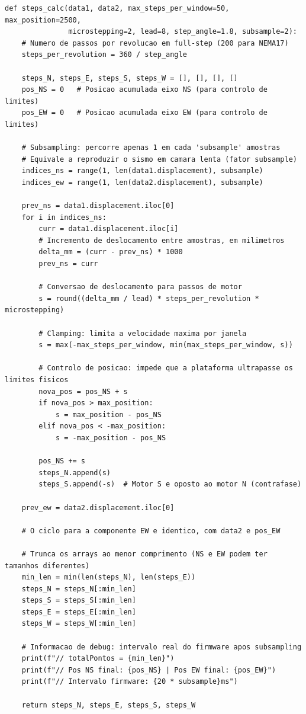 \begin{listing}[h]
\begin{verbatim}
def steps_calc(data1, data2, max_steps_per_window=50, max_position=2500,
               microstepping=2, lead=8, step_angle=1.8, subsample=2):
    # Numero de passos por revolucao em full-step (200 para NEMA17)
    steps_per_revolution = 360 / step_angle

    steps_N, steps_E, steps_S, steps_W = [], [], [], []
    pos_NS = 0   # Posicao acumulada eixo NS (para controlo de limites)
    pos_EW = 0   # Posicao acumulada eixo EW (para controlo de limites)

    # Subsampling: percorre apenas 1 em cada 'subsample' amostras
    # Equivale a reproduzir o sismo em camara lenta (fator subsample)
    indices_ns = range(1, len(data1.displacement), subsample)
    indices_ew = range(1, len(data2.displacement), subsample)

    prev_ns = data1.displacement.iloc[0]
    for i in indices_ns:
        curr = data1.displacement.iloc[i]
        # Incremento de deslocamento entre amostras, em milimetros
        delta_mm = (curr - prev_ns) * 1000
        prev_ns = curr

        # Conversao de deslocamento para passos de motor
        s = round((delta_mm / lead) * steps_per_revolution * microstepping)

        # Clamping: limita a velocidade maxima por janela
        s = max(-max_steps_per_window, min(max_steps_per_window, s))

        # Controlo de posicao: impede que a plataforma ultrapasse os limites fisicos
        nova_pos = pos_NS + s
        if nova_pos > max_position:
            s = max_position - pos_NS
        elif nova_pos < -max_position:
            s = -max_position - pos_NS

        pos_NS += s
        steps_N.append(s)
        steps_S.append(-s)  # Motor S e oposto ao motor N (contrafase)

    prev_ew = data2.displacement.iloc[0]

    # O ciclo para a componente EW e identico, com data2 e pos_EW

    # Trunca os arrays ao menor comprimento (NS e EW podem ter tamanhos diferentes)
    min_len = min(len(steps_N), len(steps_E))
    steps_N = steps_N[:min_len]
    steps_S = steps_S[:min_len]
    steps_E = steps_E[:min_len]
    steps_W = steps_W[:min_len]

    # Informacao de debug: intervalo real do firmware apos subsampling
    print(f"// totalPontos = {min_len}")
    print(f"// Pos NS final: {pos_NS} | Pos EW final: {pos_EW}")
    print(f"// Intervalo firmware: {20 * subsample}ms")

    return steps_N, steps_E, steps_S, steps_W
\end{verbatim}
\caption{Função Python de conversão de deslocamento sísmico em passos de motor.}
\label{lbl:pipeline-python}
\end{listing}

